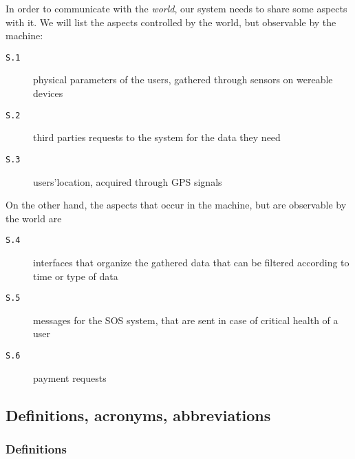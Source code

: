       In order to communicate with the \textit{world}, our system needs to share some aspects with it. We will list the aspects controlled by the world, but observable by the machine:
      \begin{description}
        \item[\texttt{S.1}] physical parameters of the users, gathered through sensors on wereable devices
        \item[\texttt{S.2}] third parties requests to the system for the data they need
        \item[\texttt{S.3}] users'location, acquired through GPS signals
      \end{description}
      On the other hand, the aspects that occur in the machine, but are observable by the world are
      \begin{description}
        \item[\texttt{S.4}] interfaces that organize the gathered data that can be filtered according to time or type of data
        \item[\texttt{S.5}] messages for the SOS system, that are sent in case of critical health of a user
        \item[\texttt{S.6}] payment requests
      \end{description}

  \subsection{Definitions, acronyms, abbreviations}

    \subsubsection{Definitions}
    \label{sec:definitions}

